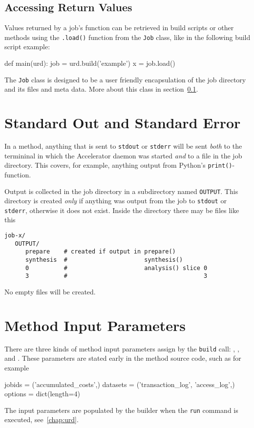 \subsection{Accessing Return Values}
Values returned by a job's \synthesis function can be retrieved in
build scripts or other methods using the \texttt{.load()} function
from the \texttt{Job} class, like in the following build script
example:
\begin{python}
def main(urd):
    job = urd.build('example')
    x = job.load()
\end{python}
The \texttt{Job} class is designed to be a user friendly encapsulation
of the job directory and its files and meta data.  More about this
class in section~\ref{}.



\section{Standard Out and Standard Error}
\label{sec:OUTPUT}

In a method, anything that is sent to \texttt{stdout} or
\texttt{stderr} will be sent \textsl{both} to the termininal in which
the Accelerator daemon was started \textsl{and} to a file in the job
directory.  This covers, for example, anything output from Python's
\texttt{print()}-function.

Output is collected in the job directory in a subdirectory named
\texttt{OUTPUT}.  This directory is created \textsl{only} if anything
was output from the job to \texttt{stdout} or \texttt{stderr},
otherwise it does not exist.  Inside the directory there may be files
like this
\begin{verbatim}
job-x/
   OUTPUT/
      prepare    # created if output in prepare()
      synthesis  #                      synthesis()
      0          #                      analysis() slice 0
      3          #                                       3
\end{verbatim}
No empty files will be created.



\section{Method Input Parameters}
\label{sec:input_params}

There are three kinds of method input parameters assign by
the \texttt{build} call: \jobids, \datasets, and \options.  These
parameters are stated early in the method source code, such as for
example
\begin{python}
jobids = ('accumulated_costs',)
datasets = ('transaction_log', 'access_log',)
options = dict(length=4)
\end{python}
The input parameters are populated by the builder when the
\texttt{run} command is executed, see~\ref{chap:urd}.

